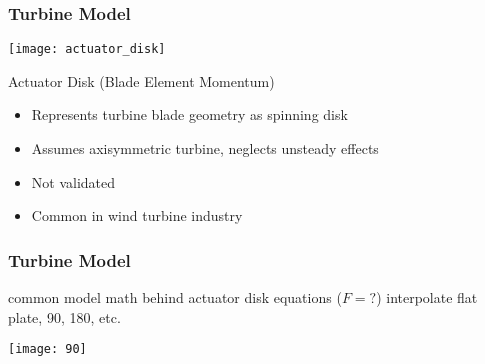 \documentclass[mathserif]{beamer}
\begin{document}
%
%
%
\begin{frame}
 \frametitle{Turbine Model}

 \begin{center}
  \texttt{[image: actuator\_disk]}
 \end{center}
 
 \begin{block}{Actuator Disk (Blade Element Momentum)}
  \begin{itemize}
  \item Represents turbine blade geometry as spinning disk
  \item Assumes axisymmetric turbine, neglects unsteady effects
  \item Not validated
  \item Common in wind turbine industry
  \end{itemize}
 \end{block}

\end{frame}

%
%
%
\begin{frame}
 \frametitle{Turbine Model}

 common model
 math behind actuator disk equations ($F=?$)
 interpolate
 flat plate, 90, 180, etc.

   \begin{center}
    \texttt{[image: 90]}
   \end{center}

 
\end{frame}
\end{document}
